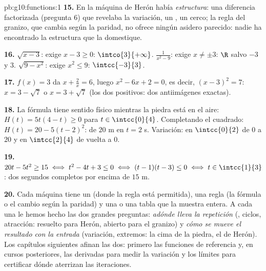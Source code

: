 \begin{solution}{pb:g10:functions:1}
\textbf{15.} En la máquina de Herón había \emph{estructura}: una
diferencia factorizada (pregunta 6) que revelaba la variación, un ,
un cerco; la regla del granizo, que cambia según la paridad, no ofrece
ningún asidero parecido: nadie ha encontrado la estructura que la
domestique.

\textbf{16.} $\sqrt{x - 3}$: exige $x - 3 \geq 0$: $\intco{3}{+\infty}$.
$\frac{1}{x^2 - 9}$: exige $x \neq \pm 3$: $\R$ salvo $-3$ y $3$.
$\sqrt{9 - x^2}$: exige $x^2 \leq 9$: $\intcc{-3}{3}$.

\textbf{17.} $f(x) = 3$ da $x + \frac2x = 6$, luego $x^2 - 6x + 2 = 0$, es
decir, $(x - 3)^2 = 7$: $x = 3 - \sqrt7$ o $x = 3 + \sqrt7$ (los dos
positivos: dos antiimágenes exactas).

\textbf{18.} La fórmula tiene sentido físico mientras la piedra está en el
aire: $H(t) = 5t(4 - t) \geq 0$ para $t \in \intcc{0}{4}$. Completando el
cuadrado: $H(t) = 20 - 5(t - 2)^2$:  de $20$ m en $t = 2$ s.
Variación:  en $\intcc{0}{2}$ de $0$ a $20$ y  en
$\intcc{2}{4}$ de vuelta a $0$.

\textbf{19.} $20t - 5t^2 \geq 15 \iff t^2 - 4t + 3 \leq 0 \iff
(t - 1)(t - 3) \leq 0 \iff t \in \intcc{1}{3}$: dos segundos completos por
encima de $15$ m.

\textbf{20.} Cada máquina tiene un  (donde la regla está
permitida), una regla (la fórmula o el cambio según la paridad) y una
 o una tabla que la muestra entera. A cada una le hemos hecho las
dos grandes preguntas: \emph{adónde lleva la repetición} (,
ciclos, atracción: resuelto para Herón, abierto para el granizo) y
\emph{cómo se mueve el resultado con la entrada} (variación, extremos: la
cima de la piedra, el  de Herón). Los capítulos siguientes afinan
las dos: primero las funciones de referencia y, en cursos posteriores, las
derivadas para medir la variación y los límites para certificar dónde
aterrizan las iteraciones.
\end{solution}
